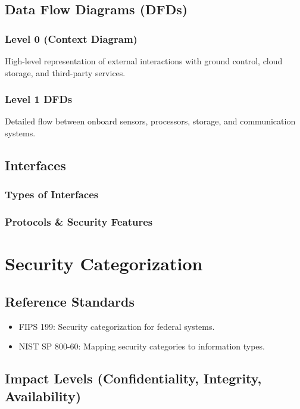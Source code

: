 \documentclass{article}
\begin{document}
\subsection{Data Flow Diagrams (DFDs)}
\subsubsection{Level 0 (Context Diagram)}
High-level representation of external interactions with ground control, cloud storage, and third-party services.

\subsubsection{Level 1 DFDs}
Detailed flow between onboard sensors, processors, storage, and communication systems.

\subsection{Interfaces}
\subsubsection{Types of Interfaces}

\subsubsection{Protocols \& Security Features}

\section{Security Categorization}

\subsection{Reference Standards}
\begin{itemize}
    \item FIPS 199: Security categorization for federal systems.
    \item NIST SP 800-60: Mapping security categories to information types.
\end{itemize}

\subsection{Impact Levels (Confidentiality, Integrity, Availability)}
\end{document}
